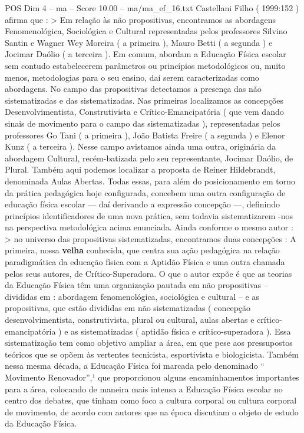 \begin{textsample}{POS Dim 4 – ma – Score 10.00 – ma/ma\_ef\_16.txt}
Castellani Filho ( 1999:152 ) afirma que : > Em relação às não propositivas, encontramos as abordagens Fenomenológica, Sociológica e Cultural representadas pelos professores Silvino Santin e Wagner Wey Moreira ( a primeira ), Mauro Betti ( a segunda ) e Jocimar Daólio ( a terceira ).
Em comum, abordam a Educação Física escolar sem contudo estabelecerem parâmetros ou princípios metodológicos ou, muito menos, metodologias para o seu ensino, daí serem caracterizadas como abordagens.
No campo das propositivas detectamos a presença das não sistematizadas e das sistematizadas.
Nas primeiras localizamos as concepções Desenvolvimentista, Construtivista e Crítico-Emancipatória ( que vem dando sinais de movimento para o campo das sistematizadas ), representadas pelos professores Go Tani ( a primeira ), João Batista Freire ( a segunda ) e Elenor Kunz ( a terceira ).
Nesse campo avistamos ainda uma outra, originária da abordagem Cultural, recém-batizada pelo seu representante, Jocimar Daólio, de Plural.
Também aqui podemos localizar a proposta de Reiner Hildebrandt, denominada Aulas Abertas.
Todas essas, para além do posicionamento em torno da prática pedagógica hoje configurada, concebem uma outra configuração de educação física escolar — daí derivando a expressão concepção —, definindo princípios identificadores de uma nova prática, sem todavia sistematizarem -nos na perspectiva metodológica acima enunciada.
Ainda conforme o mesmo autor : > no universo das propositivas sistematizadas, encontramos duas concepções : A primeira, nossa \textbf{velha} conhecida, que centra sua ação pedagógica na relação paradigmática da educação física com a Aptidão Física e uma outra chamada pelos seus autores, de Crítico-Superadora.
O que o autor expõe é que as teorias da Educação Física têm uma organização pautada em não propositivas – divididas em : abordagem fenomenológica, sociológica e cultural – e as propositivas, que estão divididas em não sistematizadas ( concepção desenvolvimentista, construtivista, plural ou cultural, aulas abertas e crítico-emancipatória ) e as sistematizadas ( aptidão física e crítico-superadora ).
Essa sistematização tem como objetivo ampliar a área, em que pese aos pressupostos teóricos que se opõem às vertentes tecnicista, esportivista e biologicista.
Também nessa mesma década, a Educação Física foi marcada pelo denominado “ Movimento Renovador”,¹ que proporcionou alguns encaminhamentos importantes para a área, colocando de maneira mais intensa a Educação Física escolar no centro dos debates, que tinham como foco a cultura corporal ou cultura corporal de movimento, de acordo com autores que na época discutiam o objeto de estudo da Educação Física.

\end{textsample}
